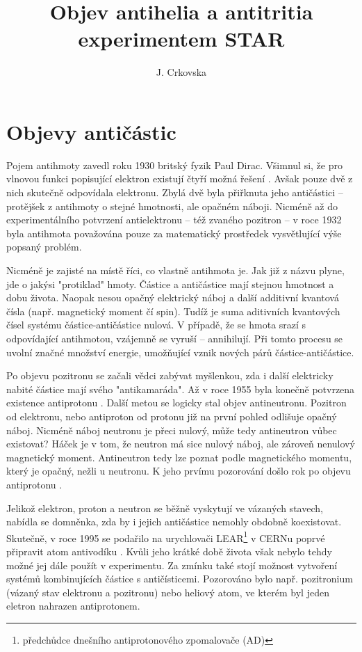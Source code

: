 \documentclass[10pt,a4paper]{article}
\title{Objev antihelia a antitritia  experimentem STAR}
\author{J. Crkovska}
\begin{document}
\maketitle




\section{Objevy antičástic}



Pojem antihmoty zavedl roku 1930 britský fyzik Paul Dirac. Všimnul si, že pro vlnovou funkci popisující elektron existují čtyří možná řešení \cite{perkins}. Avšak pouze dvě z nich skutečně odpovídala elektronu. Zbylá dvě byla přiřknuta jeho antičástici -- protějšek z antihmoty o stejné hmotnosti, ale opačném náboji. 
Nicméně až do experimentálního potvrzení antielektronu -- též zvaného pozitron -- v roce 1932 \cite{anderson_1932}  byla antihmota považována pouze za matematický prostředek vysvětlující výše popsaný problém.

Nicméně je zajisté na místě říci, co vlastně antihmota je. Jak již z názvu plyne, jde o jakýsi "protiklad" hmoty. Částice a antičástice mají stejnou hmotnost a dobu života. Naopak nesou opačný elektrický náboj a další additivní kvantová čísla (např. magnetický moment čí spin). Tudíž je suma aditivních kvantových čísel systému částice-antičástice nulová. V případě, že se hmota srazí s odpovídající antihmotou, vzájemně se vyruší -- annihilují. Při tomto procesu se uvolní značné množství energie, umožňující vznik nových párů částice-antičástice.

Po objevu pozitronu se začali vědci zabývat myšlenkou, zda i další elektricky nabité částice mají svého "antikamaráda". Až v roce 1955 byla konečně potvrzena existence antiprotonu \cite{chamberlain_1955}. Další metou se logicky stal objev antineutronu. Pozitron od elektronu, nebo antiproton od protonu již na první pohled odlišuje opačný náboj. Nicméně náboj neutronu je přeci nulový, může tedy antineutron vůbec existovat? Háček je v tom, že neutron má sice nulový náboj, ale zároveň nenulový magnetický moment. Antineutron tedy lze poznat podle magnetického momentu, který je opačný, nežli u neutronu. K jeho prvímu pozorování došlo rok po objevu antiprotonu \cite{cork}.

Jelikož elektron, proton a neutron se běžně vyskytují ve vázaných stavech, nabídla se domněnka, zda by i jejich antičástice nemohly obdobně koexistovat. Skutečně, v roce 1995 se podařilo na urychlovači LEAR\footnote{předchůdce dnešního antiprotonového zpomalovače (AD)} v CERNu poprvé připravit atom antivodíku \cite{lear}. Kvůli jeho krátké době života však nebylo tehdy možné jej dále použít v experimentu.
Za zmínku také stojí možnost vytvoření systémů kombinujících částice s antičísticemi. %
Pozorováno bylo např. pozitronium (vázaný stav elektronu a pozitronu) nebo heliový atom, ve kterém byl jeden eletron nahrazen antiprotonem.
\end{document}
